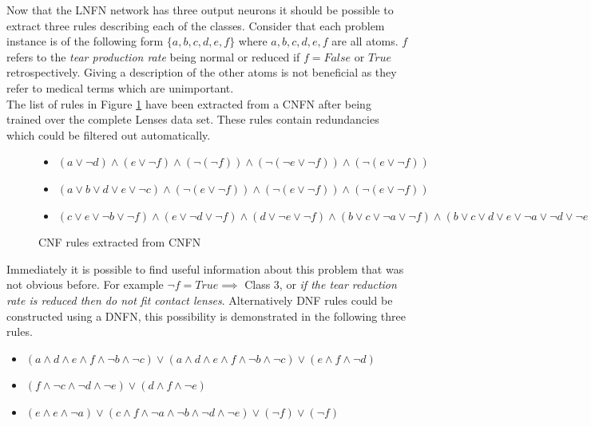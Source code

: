 Now that the LNFN network has three output neurons it should be possible to extract three rules describing each of the classes. Consider that each problem instance is of the following form $\{a, b, c, d, e, f\}$ where $a,b,c,d,e,f$ are all atoms. $f$ refers to the \textit{tear production rate} being normal or reduced if $f = False$ or $True$ retrospectively. Giving a description of the other atoms is not beneficial as they refer to medical terms which are unimportant.\\

The list of rules in Figure \ref{fig:lenses-cnfn-rules} have been extracted from a CNFN after being trained over the complete Lenses data set. These rules contain redundancies which could be filtered out automatically.

\begin{figure}[H]
	\begin{itemize}
		\item {} $(a \lor \lnot d) \land (e \lor \lnot f) \land (\lnot ( \lnot f )) \land (\lnot (\lnot e \lor \lnot f)) \land (\lnot(e \lor \lnot f))$
		\item {} $(a \lor b \lor d \lor e \lor \lnot c) \land (\lnot(e \lor \lnot f)) \land (\lnot(e \lor \lnot f)) \land (\lnot(e \lor \lnot f))$
		\item {} $(c \lor e \lor \lnot b \lor \lnot f) \land (e \lor \lnot d \lor \lnot f) \land (d \lor \lnot e \lor \lnot f) \land (b \lor c \lor \lnot a \lor \lnot f) \land (b \lor c \lor d \lor e \lor \lnot a \lor \lnot d \lor \lnot e \lor \lnot f) $
	\end{itemize}
	\caption{CNF rules extracted from CNFN}
	\label{fig:lenses-cnfn-rules}
\end{figure}


Immediately it is possible to find useful information about this problem that was not obvious before. For example $\lnot f = True \implies $ Class 3, or \textit{if the tear reduction rate is reduced then do not fit contact lenses}. Alternatively DNF rules could be constructed using a DNFN, this possibility is demonstrated in the following three rules.

\begin{itemize}
	\item {} $(a \land d \land e \land f \land \lnot b \land \lnot c) \lor (a \land d \land e \land f \land \lnot b \land \lnot c) \lor (e \land f \land \lnot d)$
	\item {} $(f \land \lnot c \land \lnot d \land \lnot e) \lor (d \land f \land \lnot e)$
	\item {} $(e \land e \land \lnot a) \lor (c \land f \land \lnot a \land \lnot b \land \lnot d \land \lnot e) \lor (\lnot f) \lor (\lnot f)$
\end{itemize}

